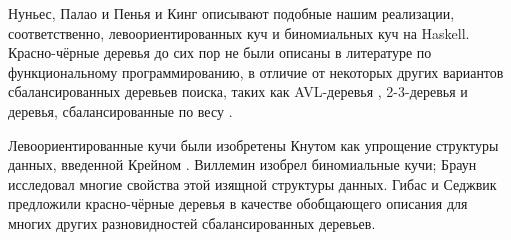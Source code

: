 Нуньес, Палао и Пенья \cite{NunezPalaoPena1995} и Кинг \cite{King1994}
описывают подобные нашим реализации, соответственно,
левоориентированных куч и биномиальных куч на Haskell.  Красно-чёрные
деревья до сих пор не были описаны в литературе по функциональному
программированию, в отличие от некоторых других вариантов
сбалансированных деревьев поиска, таких как AVL-деревья
\cite{Myers1982, Myers1984, BirdWadler1988, NunezPalaoPena1995},
2-3-деревья \cite{Reade1992} и деревья, сбалансированные по весу
\cite{Adams1993}.

Левоориентированные кучи были изобретены Кнутом \cite{Knuth1973a} как
упрощение структуры данных, введенной Крейном
\cite{Crane1972}. Виллемин \cite{Vuillemin1978} изобрел биномиальные
кучи; Браун \cite{Brown1978} исследовал многие свойства этой изящной
структуры данных. Гибас и Седжвик \cite{GuibasSedgewick1978}
предложили красно-чёрные деревья в качестве обобщающего описания для
многих других разновидностей сбалансированных деревьев.

